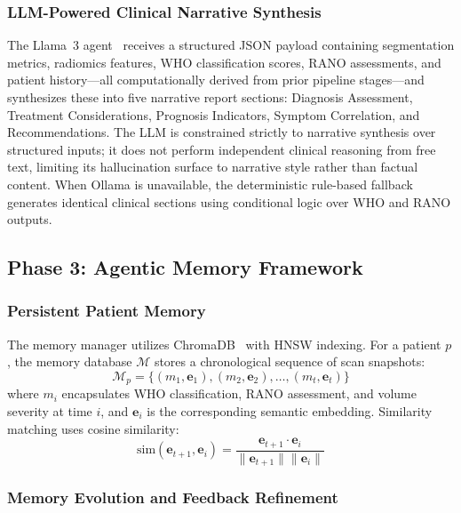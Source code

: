 \documentclass[journal]{IEEEtran}
\begin{document}
\subsubsection{LLM-Powered Clinical Narrative Synthesis}

The Llama~3 agent~\cite{meta2024} receives a structured JSON payload
containing segmentation metrics, radiomics features, WHO classification
scores, RANO assessments, and patient history---all computationally derived
from prior pipeline stages---and synthesizes these into five narrative
report sections: Diagnosis Assessment, Treatment Considerations, Prognosis
Indicators, Symptom Correlation, and Recommendations. The LLM is
constrained strictly to narrative synthesis over structured inputs; it does
not perform independent clinical reasoning from free text, limiting its
hallucination surface to narrative style rather than factual content. When
Ollama is unavailable, the deterministic rule-based fallback generates
identical clinical sections using conditional logic over WHO and RANO
outputs.

\subsection{Phase 3: Agentic Memory Framework}

\subsubsection{Persistent Patient Memory}

The memory manager utilizes ChromaDB~\cite{chroma2024} with HNSW indexing.
For a patient $p$, the memory database $\mathcal{M}$ stores a chronological
sequence of scan snapshots:
\begin{equation}
  \mathcal{M}_p = \{(m_1, \mathbf{e}_1), (m_2, \mathbf{e}_2), \ldots,
  (m_t, \mathbf{e}_t)\}
\end{equation}
where $m_i$ encapsulates WHO classification, RANO assessment, and volume
severity at time $i$, and $\mathbf{e}_i$ is the corresponding semantic
embedding. Similarity matching uses cosine similarity:
\begin{equation}
  \text{sim}(\mathbf{e}_{t+1}, \mathbf{e}_i)
  = \frac{\mathbf{e}_{t+1} \cdot \mathbf{e}_i}
         {\|\mathbf{e}_{t+1}\| \|\mathbf{e}_i\|}
\end{equation}

\subsubsection{Memory Evolution and Feedback Refinement}
\end{document}
